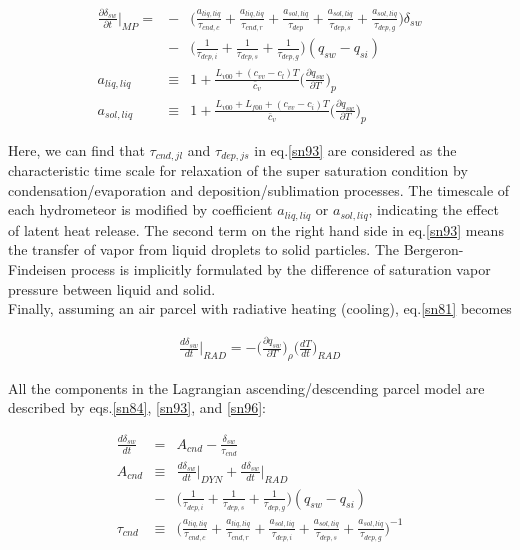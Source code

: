 \begin{eqnarray}
\frac{\partial \delta_{sw}}{\partial t}\Bigr|_{MP}=&-&\bigl(\frac{a_{liq,liq}}{\tau_{cnd,c}}+\frac{a_{liq,liq}}{\tau_{cnd,r}}+\frac{a_{sol,liq}}{\tau_{dep}}+\frac{a_{sol,liq}}{\tau_{dep,s}}+\frac{a_{sol,liq}}{\tau_{dep,g}}\bigr)\delta_{sw}\nonumber\\
&-&\bigl(\frac{1}{\tau_{dep,i}}+\frac{1}{\tau_{dep,s}}+\frac{1}{\tau_{dep,g}}\bigr)(q_{sw}-q_{si})\label{sn93}\\
a_{liq,liq}&\equiv& 1+\frac{L_{v00}+(c_{vv}-c_{l})T}{\bar{c}_{v}}\bigl(\frac{\partial q_{sw}}{\partial T}\bigr)_{p}\label{94}\\
a_{sol,liq}&\equiv& 1+\frac{L_{v00}+L_{f00}+(c_{vv}-c_{i})T}{\bar{c}_{v}}\bigl(\frac{\partial q_{sw}}{\partial T}\bigr)_{p}\label{95}
\end{eqnarray}

Here, we can find that $\tau_{cnd,jl}$ and $\tau_{dep,js}$ in eq.\ref{sn93} are considered as the characteristic time scale for relaxation of the super saturation condition by condensation/evaporation and deposition/sublimation processes. The timescale of each hydrometeor is modified by coefficient $a_{liq,liq}$ or $a_{sol,liq}$, indicating the effect of latent heat release. The second term on the right hand side in eq.\ref{sn93} means the transfer of vapor from liquid droplets to solid particles. The Bergeron-Findeisen process is implicitly formulated by the difference of saturation vapor pressure between liquid and solid.\\
Finally, assuming an air parcel with radiative heating (cooling), eq.\ref{sn81} becomes

\begin{eqnarray}
\frac{d\delta_{sw}}{dt}\Bigr|_{RAD}=-\bigl(\frac{\partial q_{sw}}{\partial T}\bigr)_{\rho}\bigl(\frac{dT}{dt}\bigr)_{RAD}\label{sn96}
\end{eqnarray}

All the components in the Lagrangian ascending/descending parcel model are described by eqs.\ref{sn84}, \ref{sn93}, and \ref{sn96}:

\begin{eqnarray}
\frac{d\delta_{sw}}{dt}&=&A_{cnd}-\frac{\delta_{sw}}{\tau_{cnd}}\label{sn97}\\
A_{cnd}&\equiv&\frac{d\delta_{sw}}{dt}\Bigr|_{DYN}+\frac{d\delta_{sw}}{dt}\Bigr|_{RAD}\nonumber\\
&-&\bigl(\frac{1}{\tau_{dep,i}}+\frac{1}{\tau_{dep,s}}+\frac{1}{\tau_{dep,g}}\bigr)(q_{sw}-q_{si})\label{sn98}\\
\tau_{cnd}&\equiv&\bigl(\frac{a_{liq,liq}}{\tau_{cnd,c}}+\frac{a_{liq,liq}}{\tau_{cnd,r}}+\frac{a_{sol,liq}}{\tau_{dep,i}}+\frac{a_{sol,liq}}{\tau_{dep,s}}+\frac{a_{sol,liq}}{\tau_{dep,g}}\bigr)^{-1}\label{sn99}
\end{eqnarray}

